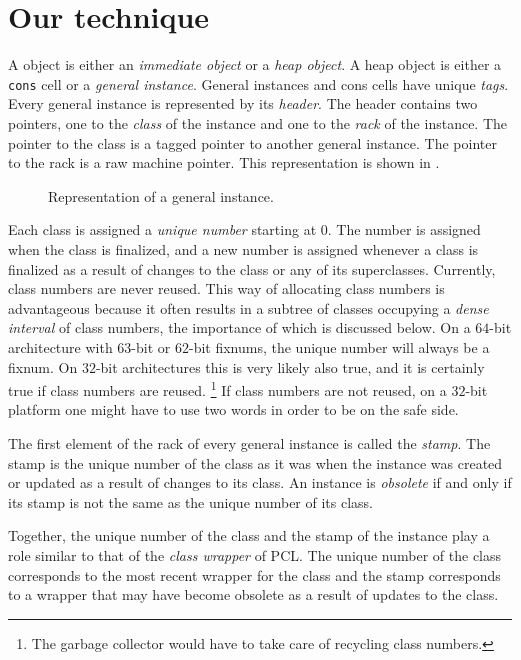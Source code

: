 \section{Our technique}

A \sicl{} object is either an \emph{immediate object} or a \emph{heap
  object}.  A heap object is either a \texttt{cons} cell or a
\emph{general instance}.  General instances and cons cells have unique
\emph{tags}.  Every general instance is represented by its
\emph{header}.  The header contains two pointers, one to the
\emph{class} of the instance and one to the \emph{rack} of the
instance.  The pointer to the class is a tagged pointer to another
general instance.  The pointer to the rack is a raw machine pointer.
This representation is shown in .

\begin{figure}
\begin{center}
\end{center}
\caption{\label{fig-general-instance}
Representation of a general instance.}
\end{figure}

Each class is assigned a \emph{unique number} starting at $0$.  The
number is assigned when the class is finalized, and a new number is
assigned whenever a class is finalized as a result of changes to the
class or any of its superclasses.  Currently, class numbers are never
reused.  This way of allocating class numbers is advantageous because
it often results in a subtree of classes occupying a \emph{dense
  interval} of class numbers, the importance of which is discussed
below.  On a $64$-bit architecture with $63$-bit or $62$-bit fixnums,
the unique number will always be a fixnum.  On $32$-bit architectures
this is very likely also true, and it is certainly true if class
numbers are reused.%
\footnote{The garbage collector would have to take care of recycling
  class numbers.}  If class numbers are not reused, on a $32$-bit
platform one might have to use two words in order to be on the safe
side.

The first element of the rack of every general instance is called the
\emph{stamp}.  The stamp is the unique number of the class as it was
when the instance was created or updated as a result of changes to its
class.  An instance is \emph{obsolete} if and only if its stamp is not
the same as the unique number of its class.

Together, the unique number of the class and the stamp of the instance
play a role similar to that of the \emph{class wrapper} of PCL.  The
unique number of the class corresponds to the most recent wrapper for
the class and the stamp corresponds to a wrapper that may have become
obsolete as a result of updates to the class.  

